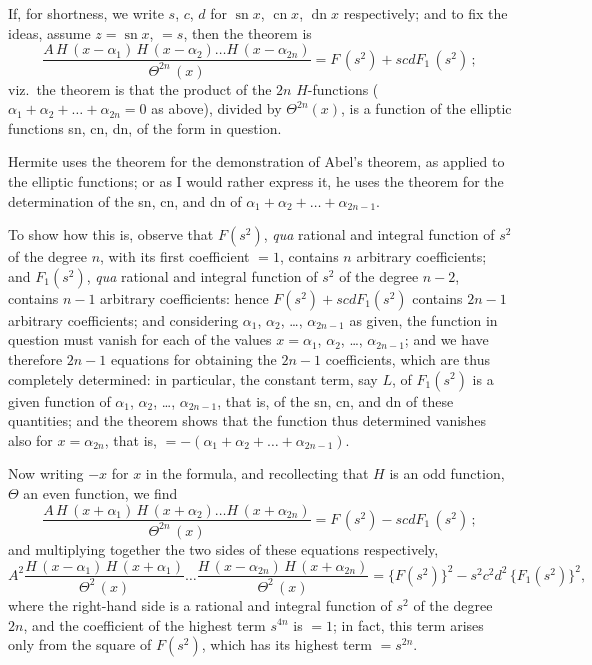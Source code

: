 \documentclass[11pt,a4paper]{article}
\theoremstyle{plain}
\theoremstyle{definition}
\begin{document}
If, for shortness, we write $s$, $c$, $d$ for $\operatorname{sn} x$, $\operatorname{cn} x$, $\operatorname{dn} x$ respectively; and to fix the ideas, assume $z = \operatorname{sn} x$, $=s$, then the theorem is
\[ \frac{A\,H\,(x-\alpha_1)\, H\,(x-\alpha_2) \ldots H\,(x-\alpha_{2n})}{\Theta^{2n}\,(x)} = F\,(s^2) + scdF_1\,(s^2)\,; \]
viz.\ the theorem is that the product of the $2n$ $H$-functions ($\alpha_1 + \alpha_2 + \ldots + \alpha_{2n} = 0$ as above), divided by $\Theta^{2n}(x)$, is a function of the elliptic functions sn, cn, dn, of the form in question.

Hermite uses the theorem for the demonstration of Abel's theorem, as applied to the elliptic functions; or as I would rather express it, he uses the theorem for the determination of the sn, cn, and dn of $\alpha_1 + \alpha_2 + \ldots + \alpha_{2n-1}$.

To show how this is, observe that $F(s^2)$, \textit{qua} rational and integral function of $s^2$ of the degree $n$, with its first coefficient $=1$, contains $n$ arbitrary coefficients; and $F_1(s^2)$, \textit{qua} rational and integral function of $s^2$ of the degree $n-2$, contains $n-1$ arbitrary coefficients: hence $F(s^2) + scdF_1(s^2)$ contains $2n-1$ arbitrary coefficients; and considering $\alpha_1$, $\alpha_2$, \ldots, $\alpha_{2n-1}$ as given, the function in question must vanish for each of the values $x = \alpha_1$, $\alpha_2$, \ldots, $\alpha_{2n-1}$; and we have therefore $2n-1$ equations for obtaining the $2n-1$ coefficients, which are thus completely determined: in particular, the constant term, say $L$, of $F_1(s^2)$ is a given function of $\alpha_1$, $\alpha_2$, \ldots, $\alpha_{2n-1}$, that is, of the sn, cn, and dn of these quantities; and the theorem shows that the function thus determined vanishes also for $x = \alpha_{2n}$, that is, $=-(\alpha_1 + \alpha_2 + \ldots + \alpha_{2n-1})$.

Now writing $-x$ for $x$ in the formula, and recollecting that $H$ is an odd function, $\Theta$ an even function, we find
\[ \frac{A\,H\,(x+\alpha_1)\, H\,(x+\alpha_2) \ldots H\,(x+\alpha_{2n})}{\Theta^{2n}\,(x)} = F\,(s^2) - scdF_1\,(s^2)\,; \]
and multiplying together the two sides of these equations respectively,
\[ A^2 \frac{H\,(x-\alpha_1)\, H\,(x+\alpha_1)}{\Theta^2\,(x)} \ldots \frac{H\,(x-\alpha_{2n})\, H\,(x+\alpha_{2n})}{\Theta^2\,(x)} = \{F(s^2)\}^2 - s^2 c^2 d^2\, \{F_1(s^2)\}^2, \]
where the right-hand side is a rational and integral function of $s^2$ of the degree $2n$, and the coefficient of the highest term $s^{4n}$ is $=1$; in fact, this term arises only from the square of $F(s^2)$, which has its highest term $= s^{2n}$.
\end{document}
